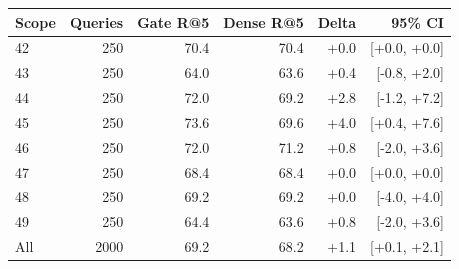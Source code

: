 \begin{tabular}{lrrrrr}
\toprule
Scope & Queries & Gate R@5 & Dense R@5 & Delta & 95\% CI \\
\midrule
42 & 250 & 70.4 & 70.4 & +0.0 & [+0.0, +0.0] \\
43 & 250 & 64.0 & 63.6 & +0.4 & [-0.8, +2.0] \\
44 & 250 & 72.0 & 69.2 & +2.8 & [-1.2, +7.2] \\
45 & 250 & 73.6 & 69.6 & +4.0 & [+0.4, +7.6] \\
46 & 250 & 72.0 & 71.2 & +0.8 & [-2.0, +3.6] \\
47 & 250 & 68.4 & 68.4 & +0.0 & [+0.0, +0.0] \\
48 & 250 & 69.2 & 69.2 & +0.0 & [-4.0, +4.0] \\
49 & 250 & 64.4 & 63.6 & +0.8 & [-2.0, +3.6] \\
\midrule
All & 2000 & 69.2 & 68.2 & +1.1 & [+0.1, +2.1] \\
\bottomrule
\end{tabular}
